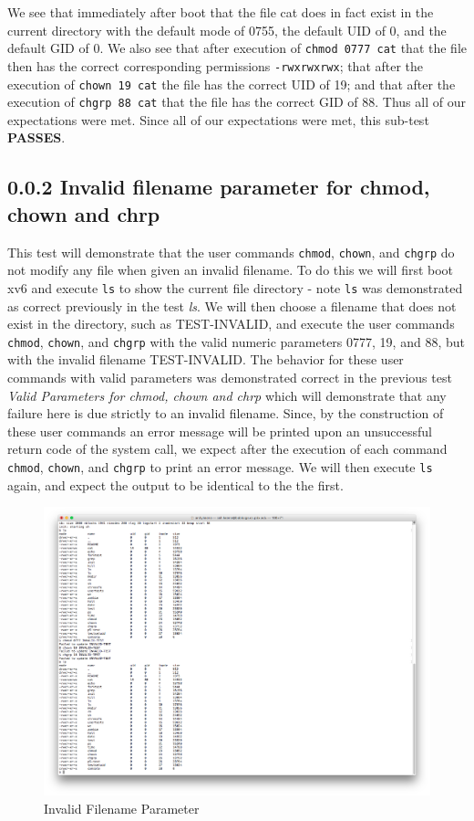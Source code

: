 \documentclass[11pt,letterpaper]{report}
\begin{document}
\pagebreak


We see that immediately after boot that the file cat does in fact exist in the current directory with the default mode of 0755, the default UID of 0, and the default GID of 0. We also see that after execution of {\tt chmod 0777 cat}
that the file then has the correct corresponding permissions  {\tt -rwxrwxrwx}; that after the execution of {\tt chown 19 cat} the file has the correct UID of 19; and that after the execution of {\tt chgrp 88 cat} that the file has the correct
GID of 88. Thus all of our expectations were met. Since all of our expectations were met, this sub-test \textbf{PASSES}.

	\subsection*{0.0.2 Invalid filename parameter for chmod, chown and chrp}

	This test will demonstrate that the user commands {\tt chmod}, {\tt chown}, and {\tt chgrp} do not modify any file when given an invalid filename.
		To do this we will first boot xv6 and execute {\tt ls} to show the current file directory - note {\tt ls} was demonstrated as correct previously in the test \emph{ls}. We will then choose a filename that does not exist in the
		directory, such as TEST-INVALID, and execute the user commands {\tt chmod}, {\tt chown}, and {\tt chgrp} with the valid numeric parameters 0777, 19, and 88, but with the invalid filename TEST-INVALID. The behavior for
		these user commands with valid parameters was demonstrated correct in the previous test \emph{Valid Parameters for chmod, chown and chrp} which will demonstrate that any failure here is due strictly to an invalid filename.
		Since, by the construction of these user commands an error message will be printed upon an unsuccessful return code of the system call, we expect after the execution of each command  {\tt chmod}, {\tt chown}, and {\tt chgrp} 
		to print an error message. We will then execute {\tt ls} again, and expect the output to be identical to the the first.
		
		
\begin{figure}[h!]
\centering
\includegraphics[width=0.8\linewidth]{invalidfilename.png}
\caption{Invalid Filename Parameter}
\label{fig:datetest}
\end{figure}
\end{document}
